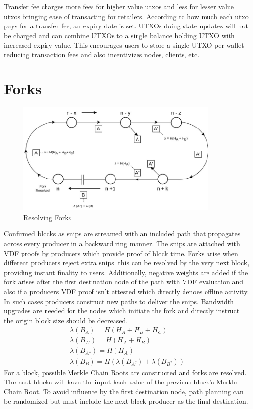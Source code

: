 \documentclass[a4paper,10pt]{article}
\begin{document}
 Transfer fee charges more fees for higher value utxos and less for lesser value utxos bringing ease of transacting for retailers. According to how much each utxo pays for a transfer fee, an expiry date is set. UTXOs doing state updates will not be charged and can combine UTXOs to a single balance holding UTXO with increased expiry value. This encourages users to store a single UTXO per wallet reducing transaction fees and also incentivizes nodes, clients, etc.  
\section{Forks}
\begin{figure}[H]
\begin{center}
\includegraphics[width=10cm]{fork}
\caption{Resolving Forks}
\end{center}
\end{figure}
Confirmed blocks as snips are streamed with an included path that propagates across every producer in a backward ring manner. The snips are attached with VDF proofs by producers which provide proof of block time. Forks arise when different producers reject extra snips, this can be resolved by the very next block, providing instant finality to users. Additionally, negative weights are added if the fork arises after the first destination node of the path with VDF evaluation and also if a producers VDF proof isn't attested which directly denoes offline activity. In such cases producers construct new paths to deliver the snips. Bandwidth upgrades are needed for the nodes which initiate the fork and directly instruct the origin block size should be decreased.
\begin{align}
\lambda (B_A) = H(H_A+H_B+H_C) \\
\lambda (B_{A'}) = H(H_A+H_B)\\
\lambda (B_{A''}) = H(H_A)  \\
\lambda (B_{B}) = H(\lambda(B_{A^?}) + \lambda(B_{B^?}))
\end{align}
For a block, possible Merkle Chain Roots are constructed and forks are resolved. The next blocks will have the input hash value of the previous block's Merkle Chain Root. To avoid influence by the first destination node, path planning can be randomized but must include the next block producer as the final destination.
\end{document}
